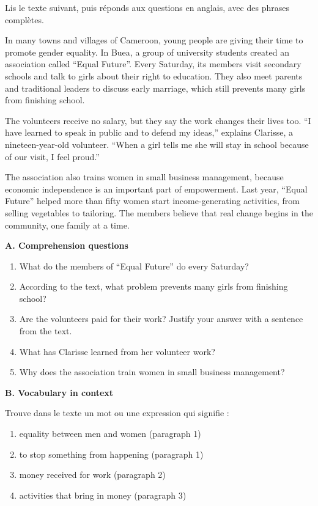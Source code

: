 \documentclass[11pt]{article}
\newcounter{popsec}
\newcounter{popsub}
\newcommand{\courssub}[1]{%
  \stepcounter{popsub}%
  \par\vspace{9pt}\noindent{\popxbold\fontsize{11.5}{13}\selectfont\color{popink}{\color{poporange}\thepopsec.\thepopsub}\hspace{6pt}#1}\par\nopagebreak\vspace{4pt}
}
\begin{document}
\courssub{Je me prépare au Bac}

\begin{exercice}
Lis le texte suivant, puis réponds aux questions en anglais, avec des phrases complètes.

\begin{textebox}
In many towns and villages of Cameroon, young people are giving their time to promote gender equality. In Buea, a group of university students created an association called “Equal Future”. Every Saturday, its members visit secondary schools and talk to girls about their right to education. They also meet parents and traditional leaders to discuss early marriage, which still prevents many girls from finishing school.

The volunteers receive no salary, but they say the work changes their lives too. “I have learned to speak in public and to defend my ideas,” explains Clarisse, a nineteen-year-old volunteer. “When a girl tells me she will stay in school because of our visit, I feel proud.”

The association also trains women in small business management, because economic independence is an important part of empowerment. Last year, “Equal Future” helped more than fifty women start income-generating activities, from selling vegetables to tailoring. The members believe that real change begins in the community, one family at a time.
\end{textebox}

\textbf{A. Comprehension questions}
\begin{enumerate}
\item What do the members of “Equal Future” do every Saturday?
\item According to the text, what problem prevents many girls from finishing school?
\item Are the volunteers paid for their work? Justify your answer with a sentence from the text.
\item What has Clarisse learned from her volunteer work?
\item Why does the association train women in small business management?
\end{enumerate}

\textbf{B. Vocabulary in context}

Trouve dans le texte un mot ou une expression qui signifie :
\begin{enumerate}
\item equality between men and women (paragraph 1)
\item to stop something from happening (paragraph 1)
\item money received for work (paragraph 2)
\item activities that bring in money (paragraph 3)
\end{enumerate}
\end{exercice}
\end{document}
